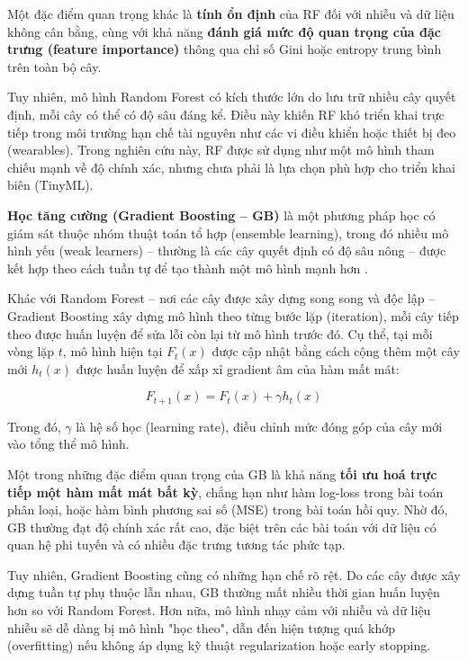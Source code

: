Một đặc điểm quan trọng khác là \textbf{tính ổn định} của RF 
đối với nhiễu và dữ liệu không cân bằng, cùng với khả năng 
\textbf{đánh giá mức độ quan trọng của đặc trưng (feature importance)} 
thông qua chỉ số Gini hoặc entropy trung bình trên toàn bộ cây.

Tuy nhiên, mô hình Random Forest có kích thước lớn do lưu trữ nhiều 
cây quyết định, mỗi cây có thể có độ sâu đáng kể. Điều này khiến RF 
khó triển khai trực tiếp trong môi trường hạn chế tài nguyên như các 
vi điều khiển hoặc thiết bị đeo (wearables). Trong nghiên cứu này, 
RF được sử dụng như một mô hình tham chiếu mạnh về độ chính xác, 
nhưng chưa phải là lựa chọn phù hợp cho triển khai biên (TinyML).


\textbf{Học tăng cường (Gradient Boosting – GB)} là một phương pháp học 
có giám sát thuộc nhóm thuật toán tổ hợp (ensemble learning), 
trong đó nhiều mô hình yếu (weak learners) – thường là các cây quyết định có độ sâu nông – 
được kết hợp theo cách tuần tự để tạo thành một mô hình mạnh hơn \cite{chen2016xgboost}.

Khác với Random Forest – nơi các cây được xây dựng song song và độc lập 
– Gradient Boosting xây dựng mô hình theo từng bước lặp (iteration), 
mỗi cây tiếp theo được huấn luyện để sửa lỗi còn lại từ mô hình trước đó. 
Cụ thể, tại mỗi vòng lặp $t$, mô hình hiện tại $F_t(x)$ được cập nhật 
bằng cách cộng thêm một cây mới $h_t(x)$ được huấn luyện để xấp xỉ 
gradient âm của hàm mất mát:

\begin{equation}
F_{t+1}(x) = F_t(x) + \gamma h_t(x)
\end{equation}

Trong đó, $\gamma$ là hệ số học (learning rate), điều chỉnh mức đóng góp của cây mới vào tổng thể mô hình.

Một trong những đặc điểm quan trọng của GB là khả năng 
\textbf{tối ưu hoá trực tiếp một hàm mất mát bất kỳ}, 
chẳng hạn như hàm log-loss trong bài toán phân loại, hoặc hàm bình 
phương sai số (MSE) trong bài toán hồi quy. Nhờ đó, GB thường đạt độ 
chính xác rất cao, đặc biệt trên các bài toán với dữ liệu có quan 
hệ phi tuyến và có nhiều đặc trưng tương tác phức tạp.

Tuy nhiên, Gradient Boosting cũng có những hạn chế rõ rệt. 
Do các cây được xây dựng tuần tự phụ thuộc lẫn nhau, 
GB thường mất nhiều thời gian huấn luyện hơn so với Random Forest. 
Hơn nữa, mô hình nhạy cảm với nhiễu và dữ liệu nhiễu sẽ dễ dàng 
bị mô hình "học theo", dẫn đến hiện tượng quá khớp (overfitting) 
nếu không áp dụng kỹ thuật regularization hoặc early stopping.

